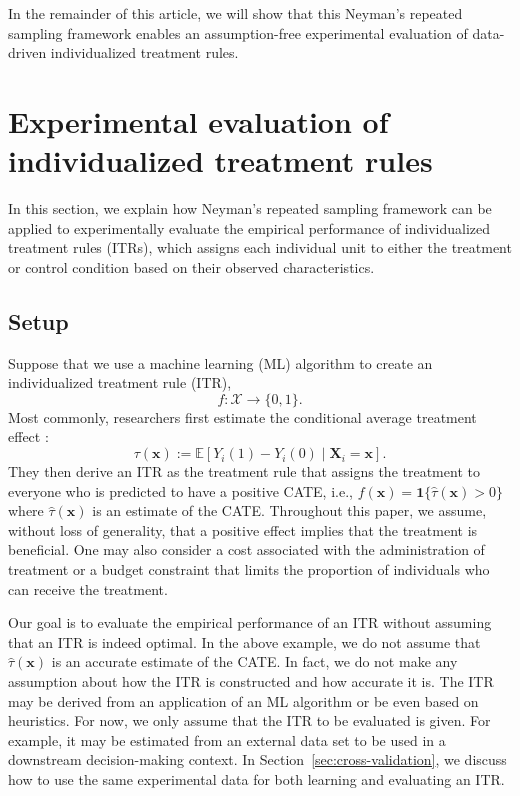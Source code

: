 \documentclass[USenglish,onecolumn]{article}
\newcommand\E{\mathbb{E}}
\newcommand\cX{\mathcal{X}}
\newcommand\bx{\bm{x}}
\newcommand\bX{\bm{X}}
\begin{document}
In the remainder of this article, we will show that this Neyman's
repeated sampling framework enables an assumption-free experimental
evaluation of data-driven individualized treatment rules.

\section{Experimental evaluation of individualized treatment rules}
\label{sec:fixed}

In this section, we explain how Neyman's repeated sampling framework
can be applied to experimentally evaluate the empirical performance of
individualized treatment rules (ITRs), which assigns each individual
unit to either the treatment or control condition based on their
observed characteristics.

\subsection{Setup}

Suppose that we use a machine learning (ML) algorithm to create an
individualized treatment rule (ITR), 
\begin{equation*}
	f: \cX \longrightarrow \{0, 1\}.
\end{equation*}
Most commonly, researchers first estimate the conditional average
treatment effect \citep[see e.g.,][]{qian:murp:11,zhan:etal:12a,
	lued:vand:16a,lued:vand:16, zhou:etal:17,kita:tete:18}:
$$\tau(\bx) := \E[Y_i(1)-Y_i(0) \mid \bX_i = \bx].$$
They then
derive an ITR as the treatment rule that assigns the treatment to
everyone who is predicted to have a positive CATE, i.e.,
$f(\bx) = \mathbf{1}\{\hat\tau(\bx) > 0\}$ where $\hat\tau(\bx)$ is an
estimate of the CATE.  Throughout this paper, we assume, without loss
of generality, that a positive effect implies that the treatment is
beneficial.  One may also consider a cost associated with the
administration of treatment or a budget constraint that limits the
proportion of individuals who can receive the treatment.

Our goal is to evaluate the empirical performance of an ITR without
assuming that an ITR is indeed optimal.  In the above example, we do
not assume that $\hat\tau(\bx)$ is an accurate estimate of the CATE.
In fact, we do not make any assumption about how the ITR is
constructed and how accurate it is.  The ITR may be derived from an
application of an ML algorithm or be even based on heuristics.  For
now, we only assume that the ITR to be evaluated is given.  For
example, it may be estimated from an external data set to be used in a downstream decision-making context.  In
Section~\ref{sec:cross-validation}, we discuss how to use the same
experimental data for both learning and evaluating an ITR.
\end{document}
